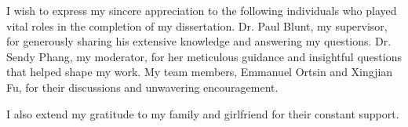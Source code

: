 \cleardoublepage
{}


\begin{acknowledgements}

I wish to express my sincere appreciation to the following individuals who played vital roles in the completion of my dissertation. Dr. Paul Blunt, my supervisor, for generously sharing his extensive knowledge and answering my questions. Dr. Sendy Phang, my moderator, for her meticulous guidance and insightful questions that helped shape my work. My team members, Emmanuel Ortsin and Xingjian Fu, for their discussions and unwavering encouragement.

I also extend my gratitude to my family and girlfriend for their constant support.

\end{acknowledgements}